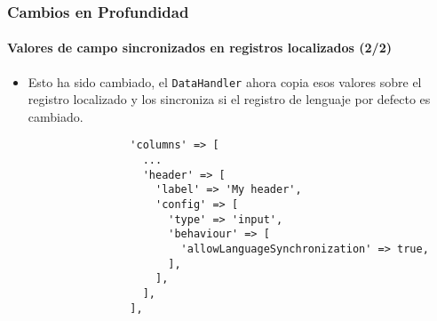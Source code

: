 
\begin{frame}[fragile]
	\frametitle{Cambios en Profundidad}
	\framesubtitle{Valores de campo sincronizados en registros localizados (2/2)}

	\lstset{basicstyle=\tiny\ttfamily}

	\begin{itemize}
		\item Esto ha sido cambiado, el \texttt{DataHandler} ahora copia esos valores sobre el registro
			localizado y los sincroniza si el registro de lenguaje por defecto es cambiado.

			\begin{lstlisting}
				'columns' => [
				  ...
				  'header' => [
				    'label' => 'My header',
				    'config' => [
				      'type' => 'input',
				      'behaviour' => [
				        'allowLanguageSynchronization' => true,
				      ],
				    ],
				  ],
				],
			\end{lstlisting}

	\end{itemize}

\end{frame}


